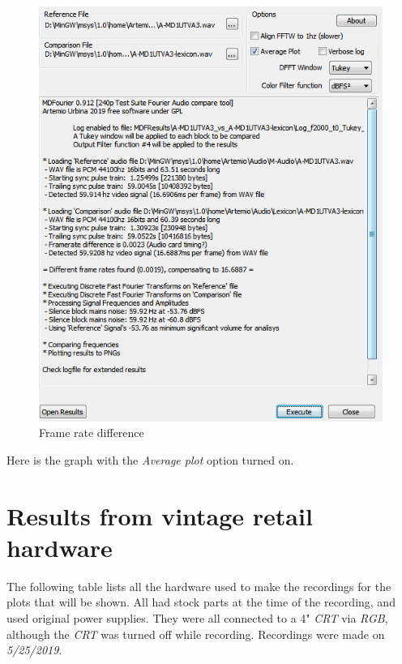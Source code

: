 \documentclass[10pt,a4paper]{report}
\begin{document}
\begin{figure}[H]
	\centering
	\includegraphics[width=0.6\linewidth]{plots/Plot5-1-FramerateDiff.png}
	\caption[Front End]{Frame rate difference}
	\label{fig:plot5-1-frameratediff}
\end{figure}

Here is the graph with the \textit{Average plot} option turned on.



\chapter{Results from vintage retail hardware}

The following table lists all the hardware used to make the recordings for the plots that will be shown. All had stock parts at the time of the recording, and used original power supplies. They were all connected to a 4" \textit{CRT} via \textit{RGB}, although the \textit{CRT} was turned off while recording. Recordings were made on \textit{5/25/2019}.
\end{document}
